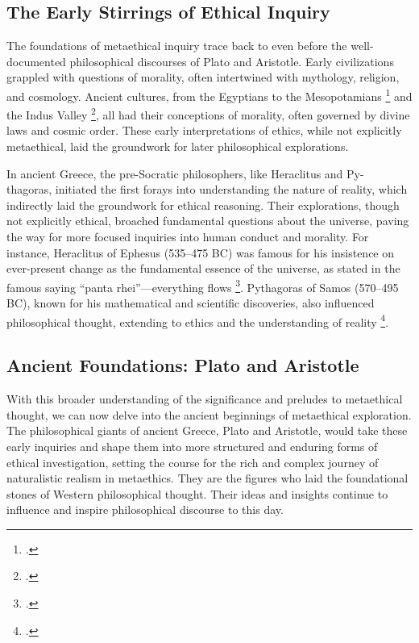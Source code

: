 \documentclass[12pt,a4paper]{article}
\begin{document}
\subsection{The Early Stirrings of Ethical Inquiry}
The foundations of metaethical inquiry trace back to even before the well-documented philosophical discourses of Plato and Aristotle. Early civilizations grappled with questions of morality, often intertwined with mythology, religion, and cosmology. Ancient cultures, from the Egyptians to the Mesopotamians \footcite{Frankfort1948} and the Indus Valley \footcite{Dales1962}, all had their conceptions of morality, often governed by divine laws and cosmic order. These early interpretations of ethics, while not explicitly metaethical, laid the groundwork for later philosophical explorations.

In ancient Greece, the pre-Socratic philosophers, like Heraclitus and Py- thagoras, initiated the first forays into understanding the nature of reality, which indirectly laid the groundwork for ethical reasoning. Their explorations, though not explicitly ethical, broached fundamental questions about the universe, paving the way for more focused inquiries into human conduct and morality. For instance, Heraclitus of Ephesus (535–475 BC) was famous for his insistence on ever-present change as the fundamental essence of the universe, as stated in the famous saying “panta rhei”—everything flows \footcite[This saying today even got its way into modern chemistry, as seen in:][]{Hessel2018}. Pythagoras of Samos (570–495 BC), known for his mathematical and scientific discoveries, also influenced philosophical thought, extending to ethics and the understanding of reality \footcite{Lambek1981}.


\subsection{Ancient Foundations: Plato and Aristotle}
With this broader understanding of the significance and preludes to metaethical thought, we can now delve into the ancient beginnings of metaethical exploration. The philosophical giants of ancient Greece, Plato and Aristotle, would take these early inquiries and shape them into more structured and enduring forms of ethical investigation, setting the course for the rich and complex journey of naturalistic realism in metaethics. They are the figures who laid the foundational stones of Western philosophical thought. Their ideas and insights continue to influence and inspire philosophical discourse to this day. 
\end{document}
